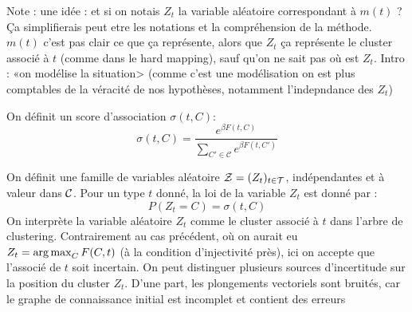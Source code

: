 {Note : une idée : et si on notais $Z_t$ la variable aléatoire correspondant à $m(t)$ ? Ça simplifierais peut etre les notations et la compréhension de la méthode. $m(t)$ c'est pas clair ce que ça représente, alors que $Z_t$ ça représente le cluster associé à $t$ (comme dans le hard mapping), sauf qu'on ne sait pas où est $Z_t$. Intro : «on modélise la situation> (comme c'est une modélisation on est plus comptables de la véracité de nos hypothèses, notamment l'indepndance des $Z_t$)

On définit un score d'association $\sigma(t, C)$:
\begin{equation}
    \sigma(t, C) = \frac{\displaystyle e^{ \beta F(t, C)}}{\displaystyle \sum_{C' \in \mathcal{C}} e^{\beta F(t, C')}}
\end{equation}

On définit une famille de variables aléatoire $\mathcal{Z} = (Z_t)_{t \in \mathcal{T}}$, indépendantes et à valeur dans $\mathcal{C}$. Pour un type $t$ donné, la loi de la variable $Z_t$ est donné par :
\begin{equation}
    P(Z_t = C) = \sigma(t, C)
\end{equation}
On interprète la variable aléatoire $Z_t$ comme le cluster associé à $t$ dans l'arbre de clustering. Contrairement au cas précédent, où on aurait eu $Z_t = \operatorname*{arg\,max}_C F(C, t)$ (à la condition d'injectivité près), ici on accepte que l'associé de $t$ soit incertain. On peut distinguer plusieurs sources d'incertitude sur la position du cluster $Z_t$. D'une part, les plongements vectoriels sont bruités, car le graphe de connaissance initial est incomplet et contient des erreurs}
\fi


